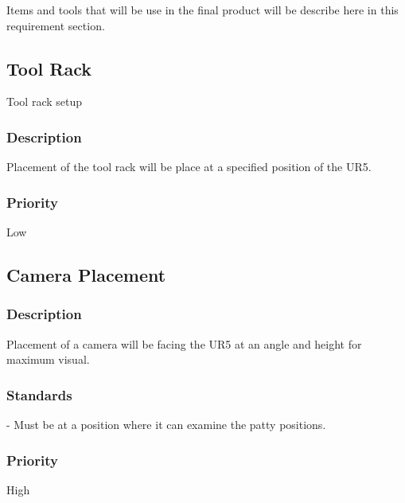 Items and tools that will be use in the final product will be describe here in this requirement section.

\subsection{Tool Rack}
Tool rack setup
\subsubsection{Description}
Placement of the tool rack will be place at a specified position of the UR5.
\subsubsection{Priority}
Low


\subsection{Camera Placement}
\subsubsection{Description}
Placement of a camera will be facing the UR5 at an angle and height for maximum visual.
\subsubsection{Standards}
- Must be at a position where it can examine the patty positions.
\subsubsection{Priority}
High
